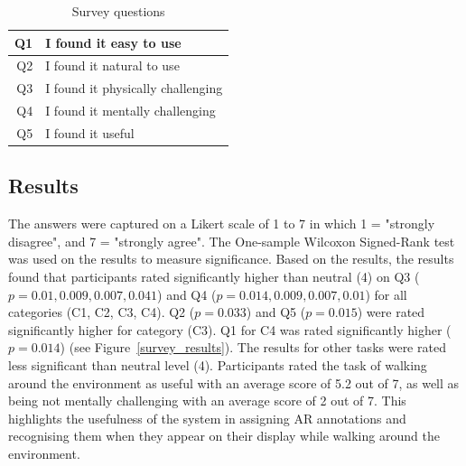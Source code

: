 \begin{table}
  \centering
    \caption{Survey questions}
    \label{table:mgia15:questions}
    \begin{tabular}{r l}
    \hline
    Q1 & I found it easy to use \\ \hline
    Q2 & I found it natural to use \\ \hline
    Q3 & I found it physically challenging \\ \hline
    Q4 & I found it mentally challenging \\ \hline
    Q5 & I found it useful \\ \hline
    \end{tabular}
\end{table}

\subsection{Results}

The answers were captured on a Likert scale of 1 to 7 in which 1 = "strongly disagree", and 7 = "strongly agree". The One-sample Wilcoxon Signed-Rank test was used on the results to measure significance. Based on the results, the results found that participants rated significantly higher than neutral (4) on Q3 ($p=0.01, 0.009, 0.007, 0.041$) and Q4 ($p=0.014, 0.009, 0.007, 0.01$) for all categories (C1, C2, C3, C4). Q2 ($p=0.033$) and Q5 ($p=0.015$) were rated significantly higher for category (C3). Q1 for C4 was rated significantly higher ($p=0.014$) (see Figure~\ref{survey_results}). The results for other tasks were rated less significant than neutral level (4). Participants rated the task of walking around the environment as useful with an average score of 5.2 out of 7, as well as being not mentally challenging with an average score of 2 out of 7. This highlights the usefulness of the system in assigning AR annotations and recognising them when they appear on their display while walking around the environment. 

